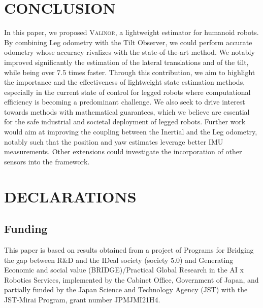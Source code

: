 \documentclass{IJCAS}
\begin{document}
\section{CONCLUSION}

In this paper, we proposed {\scshape Valinor}, a lightweight estimator for humanoid robots. By combining Leg odometry with the Tilt Observer, we could perform accurate odometry whose accuracy rivalizes with the state-of-the-art method. We notably improved significantly the estimation of the lateral translations and of the tilt, while being over 7.5 times faster. Through this contribution, we aim to highlight the importance and the effectiveness of lightweight state estimation methods, especially in the current state of control for legged robots where computational efficiency is becoming a predominant challenge. We also seek to drive interest towards methods with mathematical guarantees, which we believe are essential for the safe industrial and societal deployment of legged robots. 
Further work would aim at improving the coupling between the Inertial and the Leg odometry, notably such that the position and yaw estimates leverage better IMU measurements. Other extensions could investigate the incorporation of other sensors into the framework.



\section*{DECLARATIONS}
\subsection*{Funding }
This paper is based on results obtained from a project of Programs for Bridging the gap between R\&D and the IDeal society (society 5.0) and Generating Economic and social value (BRIDGE)/Practical Global Research in the AI x Robotics Services, implemented by the Cabinet Office, Government of Japan, and partially funded by the Japan Science and Technology Agency (JST) with the JST-Mirai Program, grant number JPMJMI21H4.


% 
% 




\end{document}

